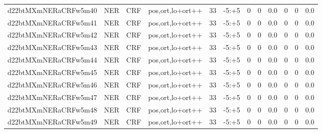 \documentclass[a4paper]{article}
\begin{document}
\begin{landscape}
\begin{center}
\begin{tabular}{ |c|c|c|c|c|c|c|c|c|c|c|c|}
 	

 
 	
 	\small{ d22btMXmNERaCRFw5m40 } & \small{ NER} & \small{  CRF }  & pos,ort,lo+ort++  &  33 &  \small{  -5:+5 }  &  0 & 0 & 0.0  &  0 & 0 & 0.0 \\
 	

 
 	
 	\small{ d22btMXmNERaCRFw5m41 } & \small{ NER} & \small{  CRF }  & pos,ort,lo+ort++  &  33 &  \small{  -5:+5 }  &  0 & 0 & 0.0  &  0 & 0 & 0.0 \\
 	

 
 	
 	\small{ d22btMXmNERaCRFw5m42 } & \small{ NER} & \small{  CRF }  & pos,ort,lo+ort++  &  33 &  \small{  -5:+5 }  &  0 & 0 & 0.0  &  0 & 0 & 0.0 \\
 	

 
 	
 	\small{ d22btMXmNERaCRFw5m43 } & \small{ NER} & \small{  CRF }  & pos,ort,lo+ort++  &  33 &  \small{  -5:+5 }  &  0 & 0 & 0.0  &  0 & 0 & 0.0 \\
 	

 
 	
 	\small{ d22btMXmNERaCRFw5m44 } & \small{ NER} & \small{  CRF }  & pos,ort,lo+ort++  &  33 &  \small{  -5:+5 }  &  0 & 0 & 0.0  &  0 & 0 & 0.0 \\
 	

 
 	
 	\small{ d22btMXmNERaCRFw5m45 } & \small{ NER} & \small{  CRF }  & pos,ort,lo+ort++  &  33 &  \small{  -5:+5 }  &  0 & 0 & 0.0  &  0 & 0 & 0.0 \\
 	

 
 	
 	\small{ d22btMXmNERaCRFw5m46 } & \small{ NER} & \small{  CRF }  & pos,ort,lo+ort++  &  33 &  \small{  -5:+5 }  &  0 & 0 & 0.0  &  0 & 0 & 0.0 \\
 	

 
 	
 	\small{ d22btMXmNERaCRFw5m47 } & \small{ NER} & \small{  CRF }  & pos,ort,lo+ort++  &  33 &  \small{  -5:+5 }  &  0 & 0 & 0.0  &  0 & 0 & 0.0 \\
 	

 
 	
 	\small{ d22btMXmNERaCRFw5m48 } & \small{ NER} & \small{  CRF }  & pos,ort,lo+ort++  &  33 &  \small{  -5:+5 }  &  0 & 0 & 0.0  &  0 & 0 & 0.0 \\
 	

 
 	
 	\small{ d22btMXmNERaCRFw5m49 } & \small{ NER} & \small{  CRF }  & pos,ort,lo+ort++  &  33 &  \small{  -5:+5 }  &  0 & 0 & 0.0  &  0 & 0 & 0.0 \\
 	


\end{tabular}
\end{center}
\end{landscape}
\end{document}
